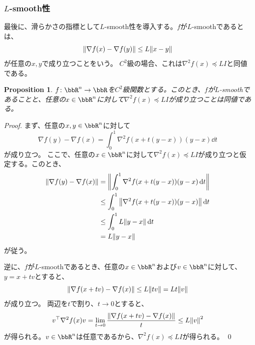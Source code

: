 \documentclass[a4paper, 10pt, dvipdfmx,draft]{article}
\newtheorem{proposition}{Proposition}
\begin{document}
\subsubsection{$L$-smooth性}

最後に、滑らかさの指標として$L$-smooth性を導入する。$f$が$L$-smoothであるとは、
\begin{equation}
    \norm{\nabla f(x)-\nabla f(y)} \le L\norm{x-y}
\end{equation}
が任意の$x,y$で成り立つことをいう。
$C^2$級の場合、これは$\nabla^2 f(x)\preceq L I$と同値である。

\begin{proposition}\label{prop:smoothness-hessian}
    $f \colon \bbR^n \to \bbR$を$C^2$級関数とする。このとき、$f$が$L$-smoothであることと、任意の$x \in \bbR^n$に対して$\nabla^2 f(x)\preceq L I$が成り立つことは同値である。
\end{proposition}
\begin{proof}
    まず、任意の$x,y \in \bbR^n$に対して
    \begin{equation*}
        \nabla f(y) - \nabla f(x)
        = \int_0^1 \nabla^2 f(x+t(y-x))(y-x) \dd{t}
    \end{equation*}
    が成り立つ。
    ここで、任意の$x \in \bbR^n$に対して$\nabla^2 f(x)\preceq L I$が成り立つと仮定する。このとき、
    \begin{align*}
        \norm{\nabla f(y) - \nabla f(x)}
         & = \norm{\int_0^1 \nabla^2 f(x+t(y-x))(y-x) \dd{t}}   \\
         & \le \int_0^1 \norm{\nabla^2 f(x+t(y-x))(y-x)} \dd{t} \\
         & \le \int_0^1 L\norm{y-x} \dd{t}                      \\
         & = L\norm{y-x}
    \end{align*}
    が従う。

    逆に、$f$が$L$-smoothであるとき、任意の$x \in \bbR^n$および$v \in \bbR^n$に対して、$y=x+tv$とすると、
    \begin{equation*}
        \norm{\nabla f(x+tv)-\nabla f(x)} \le L\norm{tv} = Lt\norm{v}
    \end{equation*}
    が成り立つ。
    両辺を$t$で割り、$t\to0$とすると、
    \begin{equation*}
        v^\top \nabla^2 f(x) v = \lim_{t\to0} \frac{\norm{\nabla f(x+tv)-\nabla f(x)}}{t} \le L\norm{v}^2
    \end{equation*}
    が得られる。$v \in \bbR^n$は任意であるから、$\nabla^2 f(x)\preceq L I$が得られる。
    \qed
\end{proof}
\end{document}
